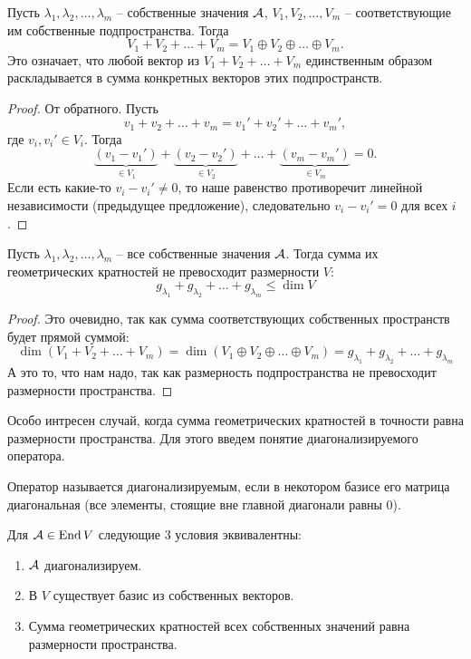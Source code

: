 \begin{follow}
    Пусть $\lambda_1, \lambda_2, \dots, \lambda_m$ -- собственные значения $\mathcal{A}$, $V_1, V_2, \dots, V_m$ -- соответствующие им собственные подпространства.
    Тогда \[ V_1 + V_2 + \dots + V_m = V_1 \oplus V_2 \oplus \dots \oplus V_m. \] 
    Это означает, что любой вектор из $V_1 + V_2 + \dots + V_m$ единственным образом раскладывается в сумма конкретных векторов этих подпространств.
\end{follow}

\begin{proof}
    От обратного. Пусть \[ v_1 + v_2 + \dots + v_m = v_1' + v_2' + \dots + v_m', \]
    \quad где $v_i, v_i' \in V_i$.
    Тогда \[ \underbrace{(v_1 - v_1')}_{\in V_1} + \underbrace{(v_2 - v_2')}_{\in V_2} + \dots + \underbrace{(v_m - v_m')}_{\in V_m} = 0. \]
    \quad Если есть какие-то $v_i - v_i' \neq 0$, то наше равенство противоречит линейной независимости (предыдущее предложение), следовательно $v_i - v_i' = 0$ для всех $i$.
\end{proof}

\begin{follow}
    Пусть $\lambda_1, \lambda_2, \dots, \lambda_m$ -- все собственные значения $\mathcal{A}$. 
    Тогда сумма их геометрических кратностей не превосходит размерности $V$:
    \[ g_{\lambda_1} + g_{\lambda_2} + \dots + g_{\lambda_m} \leqslant \dim V \]
\end{follow}
\begin{proof}
    Это очевидно, так как сумма соответствующих собственных пространств будет прямой суммой:
    \[ \dim(V_1 + V_2 + \dots + V_m) 
    = \dim(V_1 \oplus V_2 \oplus \dots \oplus V_m)
    =  g_{\lambda_1} + g_{\lambda_2} + \dots + g_{\lambda_m} \]
    \quad А это то, что нам надо, так как размерность подпространства не превосходит размерности пространства.
\end{proof}
\vspace{5mm}

Особо интресен случай, когда сумма геометрических кратностей в точности равна размерности пространства.
Для этого введем понятие диагонализируемого оператора.
\begin{conj}
    Оператор называется диагонализируемым, если в некотором базисе его матрица диагональная 
    (все элементы, стоящие вне главной диагонали равны 0).
\end{conj}

\begin{theorem}
    Для $\mathcal{A} \in \operatorname{End} V$ следующие 3 условия эквивалентны:
    \begin{enumerate}
        \item $\mathcal{A}$ диагонализируем.
        \item В $V$ существует базис из собственных векторов.
        \item Сумма геометрических кратностей всех собственных значений равна размерности пространства.
    \end{enumerate} 
\end{theorem}

